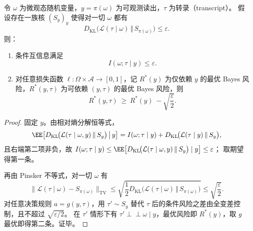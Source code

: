 \begin{theorem}\label{thm:discussion-epszk-cmi-and-risk-improvement-bound}
令 \(\omega\) 为微观态随机变量，\(y=\pi(\omega)\) 为可观测读出，\(\tau\) 为转录（transcript）。
假设存在一族核 \((S_y)_{y}\) 使得对一切 \(\omega\) 都有
\[
D_{\mathrm{KL}}\!\bigl(\mathcal L(\tau\mid \omega)\,\Vert\, S_{\pi(\omega)}\bigr)\le \varepsilon.
\]
则：
\begin{enumerate}
  \item 条件互信息满足
  \[
  I(\omega;\tau\mid y)\le \varepsilon.
  \]
  \item 对任意损失函数 \(\ell:\Omega\times\mathcal A\to[0,1]\)，记
  \(R^\ast(y)\) 为仅依赖 \(y\) 的最优 Bayes 风险，\(R^\ast(y,\tau)\) 为可依赖 \((y,\tau)\) 的最优 Bayes 风险，则
  \[
  R^\ast(y,\tau)\ \ge\ R^\ast(y)\ -\sqrt{\frac{\varepsilon}{2}}.
  \]
\end{enumerate}
\end{theorem}

\begin{proof}
固定 \(y\)。由相对熵分解恒等式，
\[
\EE\!\left[D_{\mathrm{KL}}\!\bigl(\mathcal L(\tau\mid \omega,y)\,\Vert\, S_y\bigr)\,\big|\,y\right]
=I(\omega;\tau\mid y)+D_{\mathrm{KL}}\!\bigl(\mathcal L(\tau\mid y)\,\Vert\, S_y\bigr),
\]
且右端第二项非负，故
\(
I(\omega;\tau\mid y)
\le
\EE\!\left[D_{\mathrm{KL}}\!\bigl(\mathcal L(\tau\mid \omega,y)\,\Vert\, S_y\bigr)\mid y\right]
\le \varepsilon
\)；
取期望得第一条。

再由 Pinsker 不等式，对一切 \(\omega\) 有
\[
\bigl\|\mathcal L(\tau\mid \omega)-S_{\pi(\omega)}\bigr\|_{\mathrm{TV}}
\le \sqrt{\frac12 D_{\mathrm{KL}}\!\bigl(\mathcal L(\tau\mid \omega)\,\Vert\,S_{\pi(\omega)}\bigr)}
\le \sqrt{\frac{\varepsilon}{2}}.
\]
对任意决策规则 \(a=g(y,\tau)\)，用 \(\tau'\sim S_y\) 替代 \(\tau\) 后的条件风险之差由全变差控制，且不超过 \(\sqrt{\varepsilon/2}\)。
在 \(\tau'\) 情形下有 \(\tau'\perp\!\!\!\perp \omega\mid y\)，最优风险即 \(R^\ast(y)\)，取 \(g\) 最优即得第二条。证毕。
\end{proof}

